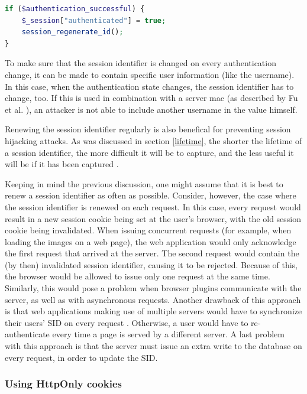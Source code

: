 \begin{lstlisting}[language=PHP]
if ($authentication_successful) {
    $_session["authenticated"] = true;
    session_regenerate_id();
}
\end{lstlisting}

To make sure that the session identifier is changed on every authentication change, it can be made to contain specific user information (like the username). In this case, when the authentication state changes, the session identifier has to change, too. If this is used in combination with a server \gls{mac} (as described by Fu et al. \cite{Fu2001}), an attacker is not able to include another username in the value himself.

Renewing the session identifier regularly is also benefical for preventing session hijacking attacks. As was discussed in section \ref{lifetime}, the shorter the lifetime of a session identifier, the more difficult it will be to capture, and the less useful it will be if it has been captured \cite{Fu2001}.

Keeping in mind the previous discussion, one might assume that it is best to renew a session identifier as often as possible. Consider, however, the case where the session identifier is renewed on each request. In this case, every request would result in a new session cookie being set at the user's browser, with the old session cookie being invalidated. When issuing concurrent requests (for example, when loading the images on a web page), the web application would only acknowledge the first request that arrived at the server. The second request would contain the (by then) invalidated session identifier, causing it to be rejected. Because of this, the browser would be allowed to issue only one request at the same time. Similarly, this would pose a problem when browser plugins communicate with the server, as well as with asynchronous requests. Another drawback of this approach is that web applications making use of multiple servers would have to synchronize their users' SID on every request \cite{Dacosta2011}. Otherwise, a user would have to re-authenticate every time a page is served by a different server. A last problem with this approach is that the server must issue an extra write to the database on every request, in order to update the SID.

\subsubsection{Using HttpOnly cookies}\label{httponly}

